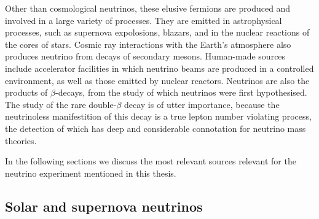 Other than cosmological neutrinos, these elusive fermions are produced and involved in a large variety of processes.
They are emitted in astrophysical processes, such as supernova expolosions, blazars, and in the nuclear reactions %
of the cores of stars.
Cosmic ray interactions with the Earth's atmosphere also produces neutrino from decays of secondary mesons.
Human-made sources include accelerator facilities in which neutrino beams are produced in a controlled environment, %
as well as those emitted by nuclear reactors.
Neutrinos are also the products of $\beta$-decays, from the study of which neutrinos were first hypothesised. 
The study of the rare double-$\beta$ decay is of utter importance, %
because the neutrinoless manifestition of this decay is a true lepton number violating process, %
the detection of which has deep and considerable connotation for neutrino mass theories.

In the following sections we discuss the most relevant sources relevant for the neutrino experiment %
mentioned in this thesis.

\subsection{Solar and supernova neutrinos}
\label{sec:nu_sun_sn}

